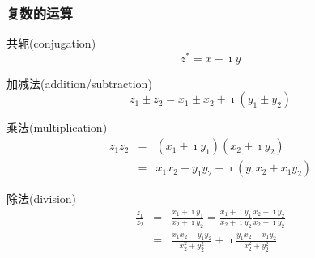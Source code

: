 \begin{frame}
    \frametitle{复数的运算}

        \begin{block}{共轭(conjugation)}
            \vspace*{-0.3cm}
            \[
                z^* = x -  \imath y
            \]
        \end{block}
            \begin{block}{加减法(addition/subtraction)}
                \vspace*{-0.3cm}
                \[
                    z_1 \pm z_2 = x_1 \pm x_2 + \imath (y_1 \pm y_2)
                \]
            \end{block}
            \begin{block}{乘法(multiplication)}
                \vspace*{-0.3cm}
                \begin{eqnarray*}
                    z_1 z_2&=& (x_1 +  \imath y_1 )  (x_2 +  \imath y_2 )
                    \\ 
                    &=& x_1 x_2 - y_1 y_2 + \imath  (y_1 x_2 + x_1 y_2)
                \end{eqnarray*}
            \end{block}
    \begin{block}{除法(division)}
        \vspace*{-0.3cm}
        \begin{eqnarray*}
            \frac{z_1}{z_2} & = & \frac{x_1 +  \imath y_1 }{x_2 +  \imath y_2 }
           = \frac{x_1 +  \imath y_1 }{x_2 +  \imath y_2 } \frac{x_2 -  \imath y_2 }{x_2 -  \imath y_2 }
            \\
            & = & \frac{x_1 x_2 - y_1 y_2} {x_2^2  +  y_2^2 }  + \imath \frac{y_1 x_2 - x_1 y_2} {x_2^2  +  y_2^2 } 
        \end{eqnarray*}
    \end{block}
\end{frame}

